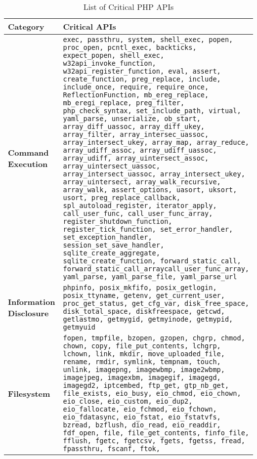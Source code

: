 \begin{table*}[t]
\caption{List of Critical PHP APIs}
\label{tab:cacs}
\begin{tabular}{|l|p{14cm}|}
\hline
    \textbf{Category}               & \textbf{Critical APIs} \\ \hline 
    \textbf{Command Execution} & \texttt{exec, passthru,
    system, shell\_exec, popen, proc\_open, pcntl\_exec, backticks, expect\_popen, shell\_exec, w32api\_invoke\_function, w32api\_register\_function, eval, assert, create\_function, preg\_replace, include, include\_once, require, require\_once, ReflectionFunction, mb\_ereg\_replace, mb\_eregi\_replace, preg\_filter, php\_check\_syntax, set\_include\_path, virtual, yaml\_parse, unserialize, ob\_start, array\_diff\_uassoc, array\_diff\_ukey, array\_filter, array\_intersec\_uassoc, array\_intersect\_ukey, array\_map,
    array\_reduce, array\_udiff\_assoc, array\_udiff\_uassoc, array\_udiff, array\_uintersect\_assoc, array\_uintersect\_uassoc, array\_intersect\_uassoc, array\_intersect\_ukey, array\_uintersect, array\_walk\_recursive, 
    array\_walk, assert\_options, uasort, uksort, usort, preg\_replace\_callback, spl\_autoload\_register, iterator\_apply, call\_user\_func, call\_user\_func\_array, 
    register\_shutdown\_function, register\_tick\_function, set\_error\_handler, set\_exception\_handler, session\_set\_save\_handler, sqlite\_create\_aggregate, sqlite\_create\_function, forward\_static\_call, forward\_static\_call\_arraycall\_user\_func\_array,
    yaml\_parse, yaml\_parse\_file, yaml\_parse\_url}
    \\ \hline
    \textbf{Information Disclosure} & \texttt{phpinfo, posix\_mkfifo, posix\_getlogin, posix\_ttyname, getenv, get\_current\_user, proc\_get\_status, get\_cfg\_var, disk\_free\_space, 
    disk\_total\_space, diskfreespace, getcwd, getlastmo, getmygid, getmyinode, getmypid, getmyuid} \\ \hline 
    \textbf{Filesystem} & \texttt{fopen, tmpfile, bzopen, gzopen, chgrp, chmod, chown, copy, file\_put\_contents, lchgrp, lchown, link, mkdir, move\_uploaded\_file, 
    rename, rmdir, symlink, tempnam, touch, unlink, imagepng, imagewbmp, image2wbmp, imagejpeg, imagexbm, imagegif, imagegd, imagegd2, iptcembed, 
    ftp\_get, gtp\_nb\_get, file\_exists, eio\_busy, eio\_chmod, eio\_chown, eio\_close, eio\_custom, eio\_dup2, eio\_fallocate, eio\_fchmod, eio\_fchown, eio\_fdatasync, eio\_fstat, eio\_fstatvfs,
    bzread, bzflush, dio\_read, eio\_readdir, fdf\_open, file, file\_get\_contents, finfo\_file, fflush, fgetc, fgetcsv, fgets, fgetss, fread, fpassthru, fscanf, ftok,
}
\end{tabular}
\end{table*}
